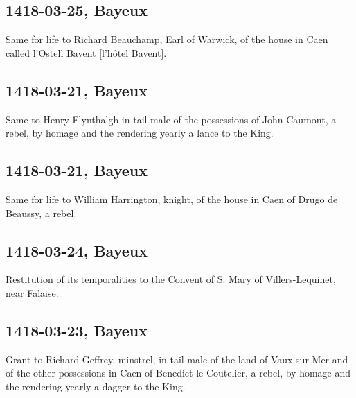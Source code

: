 \documentclass[a4paper,12pt,twoside]{book}
\begin{document}
                
                \subsection{1418-03-25, Bayeux}
                
                
                  Same for life to Richard Beauchamp, Earl of Warwick, of the house in Caen called l'Ostell Bavent [l’hôtel Bavent].
               
                
                \subsection{1418-03-21, Bayeux}
                
                
                  Same to Henry Flynthalgh in tail male of the possessions of John Caumont, a rebel, by homage and the rendering yearly a lance to the King.
               
                
                \subsection{1418-03-21, Bayeux}
                
                
                  Same for life to William Harrington, knight, of the house in Caen of Drugo de Beaussy, a rebel.
               
                
                \subsection{1418-03-24, Bayeux}
                
                
                  Restitution of its temporalities to the Convent of S. Mary of Villers-Lequinet, near Falaise.
               
                
                \subsection{1418-03-23, Bayeux}
                
                
                  Grant to Richard Geffrey, minstrel, in tail male of the land of Vaux-sur-Mer and of the other possessions in Caen of Benedict le Coutelier, a rebel, by homage and the rendering yearly a dagger to the King.
               
\end{document}
